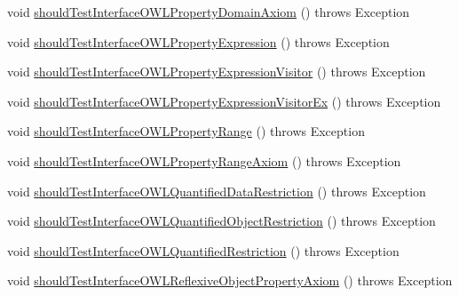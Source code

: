 \begin{DoxyCompactItemize}
\item 
void \hyperlink{classorg_1_1semanticweb_1_1owlapi_1_1contract_1_1_contract_owlapi_model__4_test_aabacf93943b3f3abac7bdf1902c69678}{should\-Test\-Interface\-O\-W\-L\-Property\-Domain\-Axiom} ()  throws Exception 
\item 
void \hyperlink{classorg_1_1semanticweb_1_1owlapi_1_1contract_1_1_contract_owlapi_model__4_test_a29de5e22511ebb88344880756f4bb931}{should\-Test\-Interface\-O\-W\-L\-Property\-Expression} ()  throws Exception 
\item 
void \hyperlink{classorg_1_1semanticweb_1_1owlapi_1_1contract_1_1_contract_owlapi_model__4_test_a3cce2beb177dbd24b7ffa3e3b33a72b6}{should\-Test\-Interface\-O\-W\-L\-Property\-Expression\-Visitor} ()  throws Exception 
\item 
void \hyperlink{classorg_1_1semanticweb_1_1owlapi_1_1contract_1_1_contract_owlapi_model__4_test_af2c2fd499dbbe8d2c8211fbf76a24533}{should\-Test\-Interface\-O\-W\-L\-Property\-Expression\-Visitor\-Ex} ()  throws Exception 
\item 
void \hyperlink{classorg_1_1semanticweb_1_1owlapi_1_1contract_1_1_contract_owlapi_model__4_test_ae6e58956f23830ab774a2583b16627bb}{should\-Test\-Interface\-O\-W\-L\-Property\-Range} ()  throws Exception 
\item 
void \hyperlink{classorg_1_1semanticweb_1_1owlapi_1_1contract_1_1_contract_owlapi_model__4_test_a518bed6015667846a3f2afe7c0fe198c}{should\-Test\-Interface\-O\-W\-L\-Property\-Range\-Axiom} ()  throws Exception 
\item 
void \hyperlink{classorg_1_1semanticweb_1_1owlapi_1_1contract_1_1_contract_owlapi_model__4_test_a98b53fae3aeb82162120a5852cb86fe5}{should\-Test\-Interface\-O\-W\-L\-Quantified\-Data\-Restriction} ()  throws Exception 
\item 
void \hyperlink{classorg_1_1semanticweb_1_1owlapi_1_1contract_1_1_contract_owlapi_model__4_test_a200b6b01d0e5455ee8d54366cb2cc0e0}{should\-Test\-Interface\-O\-W\-L\-Quantified\-Object\-Restriction} ()  throws Exception 
\item 
void \hyperlink{classorg_1_1semanticweb_1_1owlapi_1_1contract_1_1_contract_owlapi_model__4_test_a9b6595c75cb4a487cf114d8efd725f77}{should\-Test\-Interface\-O\-W\-L\-Quantified\-Restriction} ()  throws Exception 
\item 
void \hyperlink{classorg_1_1semanticweb_1_1owlapi_1_1contract_1_1_contract_owlapi_model__4_test_a80b384a4592d4f14460bdc1602c75f6a}{should\-Test\-Interface\-O\-W\-L\-Reflexive\-Object\-Property\-Axiom} ()  throws Exception 

\end{DoxyCompactItemize}
